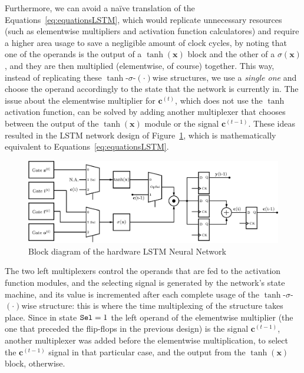 \documentclass{IEEEtran}
\newcommand{\mb}[1]{\mathbf{#1}}
\begin{document}
Furthermore, we can avoid a naïve translation of the Equations~\ref{eq:equationsLSTM}, which would replicate unnecessary resources (such as elementwise multipliers and activation function calculatores) and require a higher area usage to save a negligible amount of clock cycles, by noting that one of the operands is the output of a $\tanh(\mb{x})$ block and the other of a $\sigma(\mb{x})$, and they are then multiplied (elementwise, of course) together. This way, instead of replicating these $\tanh$-$\sigma$-$(\cdot)$wise structures, we use a \emph{single one} and choose the operand accordingly to the state that the network is currently in. The issue about the elementwise multiplier for $\mb{c}^{(t)}$, which does not use the $\tanh$ activation function, can be solved by adding another multiplexer that chooses between the output of the $\tanh(\mb{x})$ module or the signal $\mb{c}^{(t-1)}$. These ideas resulted in the LSTM network design of Figure~\ref{fig:network-opt}, which is mathematically equivalent to Equations~\ref{eq:equationsLSTM}.

\begin{figure}
    \centering
    \includegraphics[width=0.9\linewidth]{figures/network-opt.eps}
    \caption[Block diagram of the hardware LSTM Neural Network]{Block diagram of the hardware LSTM Neural Network}
    \label{fig:network-opt}
\end{figure}
The two left multiplexers control the operands that are fed to the activation function modules, and the selecting signal is generated by the network's state machine, and its value is incremented after each complete usage of the $\tanh$-$\sigma$-$(\cdot)$wise structure: this is where the time multiplexing of the structure takes place. Since in state $\verb+Sel+=1$ the left operand of the elementwise multiplier (the one that preceded the flip-flops in the previous design) is the signal $\mb{c}^{(t-1)}$, another multiplexer was added before the elementwise multiplication, to select the $\mb{c}^{(t-1)}$ signal in that particular case, and the output from the $\tanh(\mb{x})$ block, otherwise.
\end{document}
